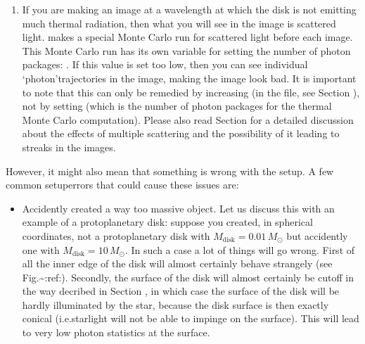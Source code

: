 \documentclass[letterpaper,10pt,english]{sphinxmanual}
\begin{document}
\begin{enumerate}
\begin{enumerate}
\item {} 
 If you are making an
image at a wavelength at which the disk is not emitting much thermal
radiation, then what you will see in the image is scattered light.
 makes a special Monte Carlo run for scattered light before
each image. This Monte Carlo run has its own variable for setting the
number of photon packages: . If this value is set too low,
then you can see individual ‘photon’\sphinxhyphen{}trajectories in the image, making the
image look bad. It is important to note that this can only be remedied by
increasing  (in the  file, see Section
{\hyperref[\detokenize{dustradtrans:sec-scat-monte-carlo}]{}}), not by setting  (which is the
number of photon packages for the thermal Monte Carlo computation). Please
also read Section {\hyperref[\detokenize{dustradtrans:sec-single-multiple-scattering}]{}} for a detailed
discussion about the effects of multiple scattering and the possibility of
it leading to streaks in the images.

\end{enumerate}

However, it might also mean that something is wrong with the setup. A few
common setup\sphinxhyphen{}errors that could cause these issues are:
\begin{itemize}
\item {} 
Accidently created a way too massive object. Let us discuss this with an
example of a protoplanetary disk: suppose you created, in spherical
coordinates, not a protoplanetary disk with
\(M_{\mathrm{disk}}=0.01\,M_{\odot}\) but accidently one with
\(M_{\mathrm{disk}}=10\,M_{\odot}\). In such a case a lot of things
will go wrong. First of all the inner edge of the disk will almost
certainly behave strangely (see Fig.\textasciitilde{}:ref:). Secondly,
the surface of the disk will almost certainly be cut\sphinxhyphen{}off in the way
decribed in Section {\hyperref[\detokenize{tipsandtricks:sec-things-going-wrong}]{}}, in which case the
surface of the disk will be hardly illuminated by the star, because the
disk surface is then exactly conical (i.e.starlight will not be able to
impinge on the surface). This will lead to very low photon statistics at
the surface.

\end{itemize}

\end{enumerate}
\end{document}
